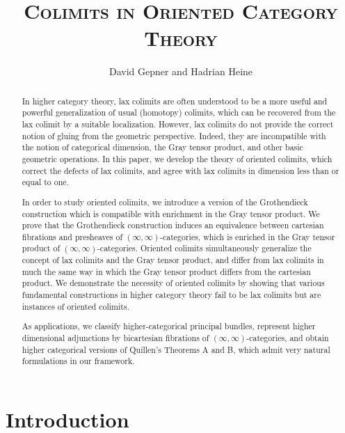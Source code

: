\documentclass[10pt,oneside]{article}
\numberwithin{equation}{section} %
\numberwithin{figure}{section} %
\theoremstyle{plain}
\theoremstyle{definition}
\begin{document}
\title{\textsc{Colimits
in Oriented Category Theory}}

\author{David Gepner and Hadrian Heine}

\maketitle

\begin{abstract}
In higher category theory, lax colimits are often understood to be a more useful and powerful generalization of usual (homotopy) colimits, which can be recovered from the lax colimit by a suitable localization.
However, lax colimits do not provide the correct notion of gluing from the geometric perspective.
Indeed, they are incompatible with the notion of categorical dimension, the Gray tensor product, and other basic geometric operations.
In this paper, we develop the theory of oriented colimits, which correct the defects of lax colimits, and agree with lax colimits in dimension less than or equal to one.

In order to study oriented colimits, we introduce a version of the Grothendieck construction which is compatible with enrichment in the Gray tensor product.
We prove that the Grothendieck construction induces an equivalence between cartesian fibrations and presheaves of $(\infty,\infty)$-categories, which is enriched in the Gray tensor product
of $(\infty,\infty)$-categories.
Oriented colimits simultaneously generalize the concept of lax colimits and the Gray tensor product,
and differ from lax colimits in much the same way in which the Gray tensor product differs from the cartesian product.
We demonstrate the necessity of oriented colimits by showing that various fundamental constructions in higher category theory fail to be lax colimits but are instances of oriented colimits.

As applications, we classify higher-categorical principal bundles, represent higher dimensional adjunctions by bicartesian fibrations of $(\infty,\infty)$-categories, and obtain higher categorical versions of Quillen's Theorems A and B, which admit very natural formulations in
our framework.


\end{abstract}

\tableofcontents

\vspace{5mm}

\section{Introduction}
\end{document}
